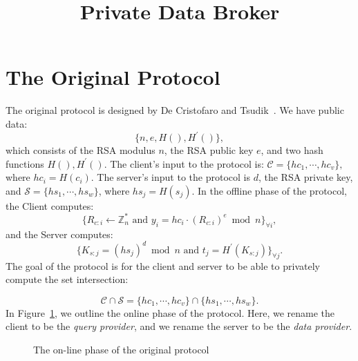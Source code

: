 \documentclass[oribibl]{llncs}
\newcommand{\ZZ}{\mathbb{Z}}
\begin{document}
\title{Private Data Broker}


\maketitle

\section*{The Original Protocol}

The original protocol is designed by De Cristofaro and Tsudik~\cite{EPRINT:DeCTsu10}. We have public data: \[ \{n, e, H(), H^{\prime}()\}, \] which consists of the RSA modulus \(n\), the RSA public key \(e\), and two hash functions \(H(), H^{\prime}()\). The client's input to the protocol is: \( \mathcal{C} = \{hc_1,\cdots,hc_v\}, \) where \(hc_i = H(c_i)\). The server's input to the protocol is \(d\), the RSA private key, and \( \mathcal{S} = \{ hs_1, \cdots, hs_w \} \), where \(hs_j = H(s_j)\). In the offline phase of the protocol, the Client computes:
\[ \{ R_{c:i} \leftarrow \ZZ_{n}^* \text{ and } y_i = hc_i \cdot (R_{c:i})^e \bmod{n} \}_{\forall i}, \]
and the Server computes: 
\[ \{ K_{s:j} = (hs_j)^d \bmod n \text{ and } t_j = H^{\prime}(K_{s:j}) \}_{\forall j}. \]
The goal of the protocol is for the client and server to be able to privately compute the set intersection:

\[ \mathcal{C} \cap \mathcal{S} = \{ hc_1, \cdots, hc_v \} \cap \{ hs_1, \cdots, hs_w \}. \]
In Figure~\ref{fig:original}, we outline the online phase of the protocol. Here, we rename the client to be the \emph{query provider}, and we rename the server to be the \emph{data provider}.

\begin{figure}[htb!]
	\centering
	\caption{The on-line phase of the original protocol}
	\label{fig:original}
\end{figure}
\end{document}

